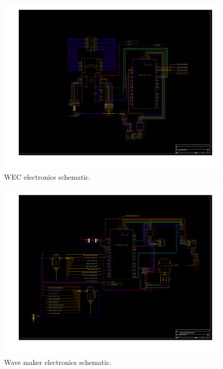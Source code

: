 \documentclass[hardware,article,submit,pdftex,moreauthors]{Definitions/mdpi}
\begin{document}
\begin{landscape}
\begin{figure}[tb]
	\centering
	\includegraphics[height=0.95\textwidth, width=\linewidth]{diagrams/SIWEED_ElecDrawings_and_UpdatedBOM/PDFs/siweed_electronics_wec_only.pdf}
	\caption{WEC electronics schematic.}
	\label{fig:siweed_electronics_wec_only}
\end{figure}
\end{landscape}

\begin{landscape}
\begin{figure}[tb]
	\centering
	\includegraphics[height=0.95\textwidth, width=\linewidth]{diagrams/SIWEED_ElecDrawings_and_UpdatedBOM/PDFs/siweed_electronics_wavemaker_only.pdf}
	\caption{Wave maker electronics schematic.}
	\label{fig:siweed_electronics_wavemaker_only}
\end{figure}
\end{landscape}
\end{document}
